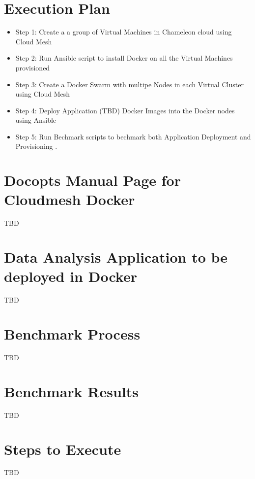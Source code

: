 \documentclass[9pt,twocolumn,twoside]{styles/osajnl}
\begin{document}
\section{Execution Plan}

\begin{itemize}
\item Step 1: Create a a group of Virtual Machines in Chameleon cloud using Cloud Mesh
 
\item Step 2: Run Ansible script to install Docker on all the Virtual Machines provisioned

\item Step 3: Create a Docker Swarm with multipe Nodes in each Virtual Cluster using Cloud Mesh

\item Step 4: Deploy Application (TBD) Docker Images into the Docker nodes using Ansible

\item Step 5: Run Bechmark scripts to bechmark both Application Deployment and Provisioning .

\end{itemize}

\section{Docopts Manual Page for Cloudmesh Docker}

TBD

\section{Data Analysis Application to be deployed in Docker}

TBD

\section{Benchmark Process}

TBD

\section{Benchmark Results}

TBD

\section{Steps to Execute}

TBD



 


\newpage

\appendix
\end{document}

